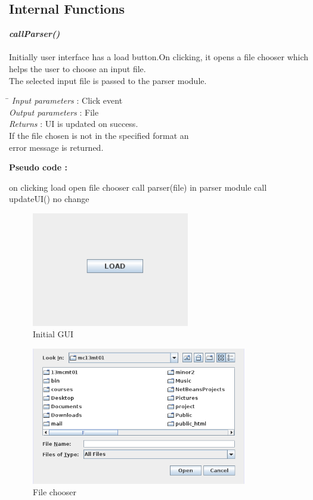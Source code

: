 \documentclass{article}
\begin{document}
\subsection{Internal Functions}
\emph{\bf callParser()}\\\\
Initially user interface has a load button.On clicking, it opens a file chooser which helps  the user to choose an input file.
\\ 
The selected input file is passed to the parser module. \\
\begin{tabbing}
\hspace*{4cm}\= \kill
\emph{Input parameters} \>: Click event \\
\emph{Output parameters} \>: File \\
\emph{Returns} \>: UI is updated on success.\\ \>If the file chosen is not in the  specified format an\\ \> error message is returned.\\
\end{tabbing}
\textbf{Pseudo code :}
\begin{algorithmic}[1]
 \STATE on clicking load
 \STATE open file chooser
  \STATE call parser(file) in parser module
  \STATE call updateUI()
  \ELSE 
  \STATE no change
  \ENDIF
 \end{algorithmic}
\begin{figure}[ht!]
\centering
\includegraphics[height=5cm]{1.png}
\caption{Initial GUI}
\end{figure}
\begin{figure}[h]
\centering
\includegraphics[height=6cm]{2.png}
\caption{File chooser}
\end{figure}
\end{document}
